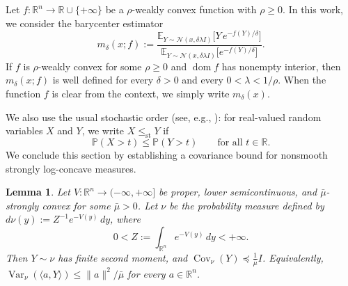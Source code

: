 \documentclass[11pt]{article}
\newcommand{\1}{\mathds{1}}
\newtheorem{lemma}[theorem]{Lemma}
\theoremstyle{definition}
\theoremstyle{remark}
\theoremstyle{definition}
\begin{document}
Let \(f\colon \mathbb{R}^n\to \mathbb{R}\cup\{+\infty\}\) be a \(\rho\)-weakly convex function with \(\rho\ge 0\). 
In this work, we consider the barycenter estimator
\[
m_{\delta}(x;f)
:=
\frac{\mathbb{E}_{Y\sim \mathcal{N}(x,\delta \lambda I)}
\!\bigl[Y\,e^{-f(Y)/\delta}\bigr]}
{\mathbb{E}_{Y\sim \mathcal{N}(x,\delta \lambda I)}
\!\bigl[e^{-f(Y)/\delta}\bigr]}.
\]
If \(f\) is \(\rho\)-weakly convex for some \(\rho\ge 0\) and
\(\operatorname{dom}f\) has nonempty interior, then \(m_\delta(x;f)\) is
well defined for every \(\delta>0\) and every \(0<\lambda<1/\rho\). When
the function \(f\) is clear from the context, we simply write
\(m_\delta(x)\).

We also use the usual stochastic order (see, e.g., \cite{ShakedShanthikumar2007}): for real-valued random variables
\(X\) and \(Y\), we write \(X\le_{\mathrm{st}}Y\) if
\[
\mathbb P(X>t)\le \mathbb P(Y>t)
\qquad \text{for all } t\in\mathbb R.
\]
We conclude this section by establishing a covariance bound for nonsmooth
strongly log-concave measures.
\begin{lemma}\label{lem:covariance-strongly-log-concave}
Let \(V\colon \mathbb R^n\to(-\infty,+\infty]\) be proper, lower semicontinuous,
and \(\bar\mu\)-strongly convex for some \(\bar\mu>0\). Let \(\nu\) be the
probability measure defined by $d\nu(y):=Z^{-1}e^{-V(y)}\,dy$,  where
\[
0<Z:=\int_{\mathbb R^n}e^{-V(y)}\,dy<+\infty.
\]
Then $Y\sim \nu$ has finite second moment, and $\operatorname{Cov}_{\nu}(Y)\preceq \frac{1}{\bar\mu}I$. Equivalently, \(\operatorname{Var}_{\nu}(\langle a,Y\rangle)\le \|a\|^{2}/\bar\mu\)
for every \(a\in\mathbb R^n\).
\end{lemma}
\end{document}
